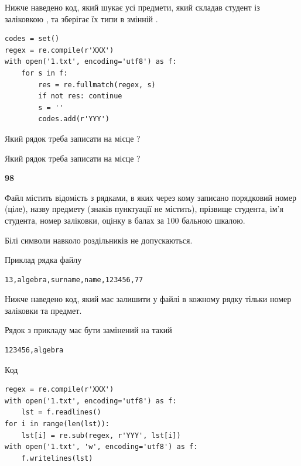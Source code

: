 Нижче наведено код, який шукає усі предмети, який складав студент із заліковкою , та зберігає їх типи в змінній .



\begin{verbatim}
codes = set()
regex = re.compile(r'XXX')
with open('1.txt', encoding='utf8') as f:
    for s in f:
        res = re.fullmatch(regex, s)
        if not res: continue
        s = ''
        codes.add(r'YYY')
\end{verbatim}





Який рядок треба записати на місце  ?\par
\vspace{5mm}


Який рядок треба записати на місце  ?\par


\newpage

{\begin {center}\textbf{ 98}\end {center}}\par
Файл  містить відомість з рядками, в яких через кому записано поряд\-ковий номер (ціле), назву предмету (знаків пунктуації не містить), прізвище студента, ім'я студента, номер заліковки, оцінку в балах за 100 бальною шкалою.

Білі символи навколо роздільників не допускаються.

Приклад рядка файлу



\begin{verbatim}
13,algebra,surname,name,123456,77
\end{verbatim}


Нижче наведено код, який має залишити у файлі в кожному рядку тільки номер заліковки та предмет.

Рядок з прикладу має бути замінений на такий



\begin{verbatim}
123456,algebra
\end{verbatim}




Код



\begin{verbatim}
regex = re.compile(r'XXX')
with open('1.txt', encoding='utf8') as f:
    lst = f.readlines()
for i in range(len(lst)):
    lst[i] = re.sub(regex, r'YYY', lst[i])
with open('1.txt', 'w', encoding='utf8') as f:
    f.writelines(lst)
\end{verbatim}









